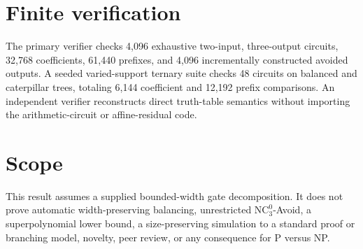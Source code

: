 \documentclass[11pt]{article}
\begin{document}
\section{Finite verification}
The primary verifier checks 4,096 exhaustive two-input, three-output circuits,
32,768 coefficients, 61,440 prefixes, and 4,096 incrementally constructed
avoided outputs.  A seeded varied-support ternary suite checks 48 circuits on
balanced and caterpillar trees, totaling 6,144 coefficient and 12,192 prefix
comparisons.  An independent verifier reconstructs direct truth-table
semantics without importing the arithmetic-circuit or affine-residual code.

\section{Scope}
This result assumes a supplied bounded-width gate decomposition.  It does not
prove automatic width-preserving balancing, unrestricted
$\mathrm{NC}^0_3$-Avoid, a superpolynomial lower bound, a size-preserving
simulation to a standard proof or branching model, novelty, peer review, or any
consequence for P versus NP.
\end{document}
